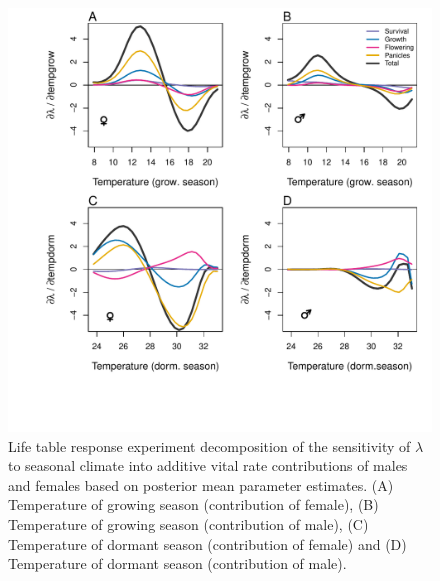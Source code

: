 \documentclass[12pt]{article}\usepackage[]{graphicx}\usepackage[dvipsnames]{xcolor}
\begin{document}
\begin{figure}[H]
	\begin{center}
		\includegraphics[width=0.95\linewidth]{Figures/LTRE_Temperature.pdf}
		\caption{Life table response experiment decomposition of the sensitivity of $\lambda$ to seasonal climate into additive vital rate contributions of males and females based on posterior mean parameter estimates.
			(A) Temperature of growing season (contribution of female), (B) Temperature of growing season (contribution of male),  (C) Temperature of dormant season (contribution of female) and (D) Temperature of dormant season (contribution of male).}
		\label{Sup:LTRETemp}
	\end{center}
\end{figure}

\end{document}
